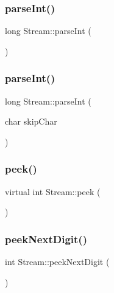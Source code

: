 \mbox{\label{class_stream_a497ffcbcb4d5bb889a8fde487bcc1b98}} 
\subsubsection{parse\+Int()\hspace{0.1cm}{\footnotesize\ttfamily [1/2]}}
{\footnotesize\ttfamily long Stream\+::parse\+Int (\begin{DoxyParamCaption}{ }\end{DoxyParamCaption})}

\mbox{\label{class_stream_a4578615defade6c4ce7daeb6578bb62d}} 
\subsubsection{parse\+Int()\hspace{0.1cm}{\footnotesize\ttfamily [2/2]}}
{\footnotesize\ttfamily long Stream\+::parse\+Int (\begin{DoxyParamCaption}\item[{char}]{skip\+Char }\end{DoxyParamCaption})\hspace{0.3cm}{\ttfamily [protected]}}

\mbox{\label{class_stream_a30c3c212ec6ea67277a708c5ea2501a5}} 
\subsubsection{peek()}
{\footnotesize\ttfamily virtual int Stream\+::peek (\begin{DoxyParamCaption}{ }\end{DoxyParamCaption})\hspace{0.3cm}{\ttfamily [pure virtual]}}

\mbox{\label{class_stream_ab31c533ddc422c8d8df07986e5920534}} 
\subsubsection{peek\+Next\+Digit()}
{\footnotesize\ttfamily int Stream\+::peek\+Next\+Digit (\begin{DoxyParamCaption}{ }\end{DoxyParamCaption})\hspace{0.3cm}{\ttfamily [protected]}}

